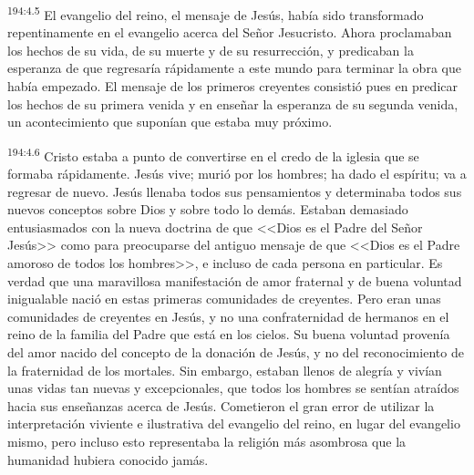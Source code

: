 \par 
\textsuperscript{194:4.5} El evangelio del reino, el mensaje de Jesús, había sido transformado repentinamente en el evangelio acerca del Señor Jesucristo. Ahora proclamaban los hechos de su vida, de su muerte y de su resurrección, y predicaban la esperanza de que regresaría rápidamente a este mundo para terminar la obra que había empezado. El mensaje de los primeros creyentes consistió pues en predicar los hechos de su primera venida y en enseñar la esperanza de su segunda venida, un acontecimiento que suponían que estaba muy próximo.

\par 
\textsuperscript{194:4.6} Cristo estaba a punto de convertirse en el credo de la iglesia que se formaba rápidamente. Jesús vive; murió por los hombres; ha dado el espíritu; va a regresar de nuevo. Jesús llenaba todos sus pensamientos y determinaba todos sus nuevos conceptos sobre Dios y sobre todo lo demás. Estaban demasiado entusiasmados con la nueva doctrina de que <<Dios es el Padre del Señor Jesús>> como para preocuparse del antiguo mensaje de que <<Dios es el Padre amoroso de todos los hombres>>, e incluso de cada persona en particular. Es verdad que una maravillosa manifestación de amor fraternal y de buena voluntad inigualable nació en estas primeras comunidades de creyentes. Pero eran unas comunidades de creyentes en Jesús, y no una confraternidad de hermanos en el reino de la familia del Padre que está en los cielos. Su buena voluntad provenía del amor nacido del concepto de la donación de Jesús, y no del reconocimiento de la fraternidad de los mortales. Sin embargo, estaban llenos de alegría y vivían unas vidas tan nuevas y excepcionales, que todos los hombres se sentían atraídos hacia sus enseñanzas acerca de Jesús. Cometieron el gran error de utilizar la interpretación viviente e ilustrativa del evangelio del reino, en lugar del evangelio mismo, pero incluso esto representaba la religión más asombrosa que la humanidad hubiera conocido jamás.

